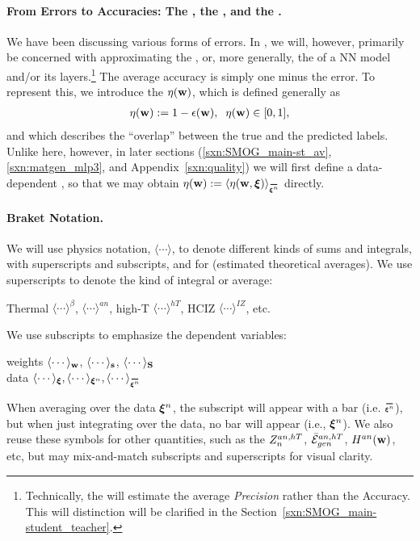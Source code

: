 \paragraph{From Errors to Accuracies: The \AverageGeneralizationAccuracy, the \Quality, and the \SelfOverlap.}
We have been discussing various forms of errors.
In \SETOL, we will, however, primarily be concerned with approximating the \emph{\AverageGeneralizationAccuracy},
or, more generally, the \Quality of a NN model and/or its layers.\footnote{Technically, the \Quality will estimate the average \emph{Precision} rather than the Accuracy.
This will distinction will be clarified in the Section~\ref{sxn:SMOG_main-student_teacher}.}
The average accuracy is simply one minus the error.
To represent this,
we introduce the \emph{\SelfOverlap} $\eta({\mathbf{w}})$, which is defined generally as
\begin{align}
 \label{eqn:def_eta}
 \eta({\mathbf{w}}) := 1 -\epsilon({\mathbf{w}}) ,\;\;\eta({\mathbf{w}})\in[0,1] ,
\end{align}
and which 
describes the ``overlap'' between the true and the predicted labels.
Unlike here, however, in later sections
(\ref{sxn:SMOG_main-st_av}, \ref{sxn:matgen_mlp3}, and Appendix~\ref{sxn:quality})
we will first define a data-dependent \SelfOverlap, so that we may obtain
 $\ETA(\WVEC):=\langle\ETA(\WVEC,\XI)\rangle_{\AVGNDXIn}$ directly.

\paragraph{Braket Notation.}
We will use physics \BraKet notation, $\langle\cdots\rangle$,
to denote different kinds of sums and integrals, with superscripts and subscripts,
and for \ExpectedValues (estimated theoretical averages).
We use superscripts to denote the kind of integral or average:
\begin{center}
Thermal $\langle\cdots\rangle^{\beta}$,
\Annealed $\langle\cdots\rangle^{an}$,
high-T $\langle\cdots\rangle^{hT}$,
HCIZ $\langle\cdots\rangle^{IZ}$, etc.
\end{center}
We use subscripts to emphasize the dependent variables:
\begin{center}
  weights $\langle\cdots\rangle_{{\mathbf{w}}}$, $\langle\cdots\rangle_{{\mathbf{s}}}$, $\langle\cdots\rangle_{{\mathbf{S}}}$ \nonumber \\
    \vspace{0.33cm}  %
data $\langle\cdots\rangle_{\XI},
\langle\cdots\rangle_{\NDXI},
\langle\cdots\rangle_{\AVGNDXI}$
\end{center}
When averaging over the data $\boldsymbol{\xi}^{n}$,  the subscript will appear with a bar (i.e. $\AVGNDXIn$), but when just integrating over the data, no bar will appear (i.e., $\boldsymbol{\xi}^{n}$). 
We also reuse these symbols for other quantities, such as the $Z^{an,hT}_{n}$, $\bar{\mathcal{E}}_{gen}^{an,hT}$, $H^{an}({\mathbf{w}})$, etc,
but may mix-and-match subscripts and superscripts for visual clarity.

